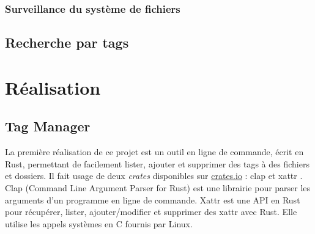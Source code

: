 \documentclass[a4paper, 12pt]{article}
\begin{document}
\subsubsection{Surveillance du système de fichiers}

\subsection{Recherche par tags}


\section{Réalisation} %
\subsection{Tag Manager}
La première réalisation de ce projet est un outil en ligne de commande, écrit en Rust, permettant 
de facilement lister, ajouter et supprimer des tags à des fichiers et dossiers. Il fait usage de 
deux \textit{crates} disponibles sur \href{https://crates.io}{crates.io} : clap \cite{ref22} et 
xattr \cite{ref23}. Clap (Command Line Argument Parser for Rust) est une librairie pour parser 
les arguments d'un programme en ligne de commande. Xattr est une API en Rust pour récupérer, lister, 
ajouter/modifier et supprimer des \acrshort{xattr} avec Rust. Elle utilise les appels systèmes 
en C fournis par Linux.
\end{document}
